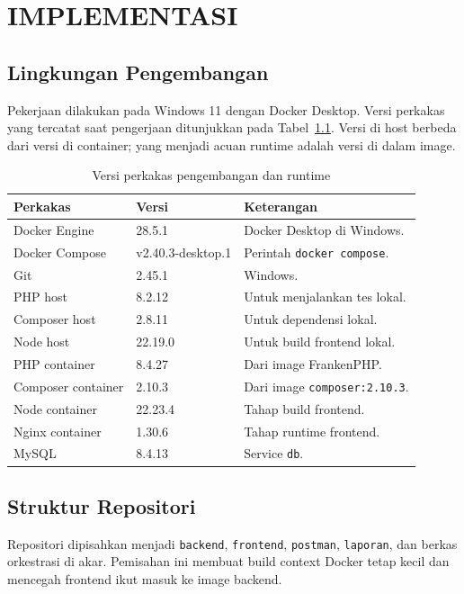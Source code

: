 \documentclass[12pt,a4paper,oneside]{book}
\begin{document}
\chapter{IMPLEMENTASI}
\label{chap:implementasi}

\section{Lingkungan Pengembangan}

Pekerjaan dilakukan pada Windows 11 dengan Docker Desktop. Versi perkakas yang
tercatat saat pengerjaan ditunjukkan pada Tabel~\ref{tab:versi}. Versi di host
berbeda dari versi di container; yang menjadi acuan runtime adalah versi di dalam
image.

\begin{table}[H]
\centering
\caption{Versi perkakas pengembangan dan runtime}
\label{tab:versi}
\begin{tabularx}{\textwidth}{@{}l l X@{}}
\toprule
\textbf{Perkakas} & \textbf{Versi} & \textbf{Keterangan} \\
\midrule
Docker Engine & 28.5.1 & Docker Desktop di Windows. \\
Docker Compose & v2.40.3-desktop.1 & Perintah \texttt{docker compose}. \\
Git & 2.45.1 & Windows. \\
PHP host & 8.2.12 & Untuk menjalankan tes lokal. \\
Composer host & 2.8.11 & Untuk dependensi lokal. \\
Node host & 22.19.0 & Untuk build frontend lokal. \\
PHP container & 8.4.27 & Dari image FrankenPHP. \\
Composer container & 2.10.3 & Dari image \texttt{composer:2.10.3}. \\
Node container & 22.23.4 & Tahap build frontend. \\
Nginx container & 1.30.6 & Tahap runtime frontend. \\
MySQL & 8.4.13 & Service \texttt{db}. \\
\bottomrule
\end{tabularx}
\end{table}

\section{Struktur Repositori}

Repositori dipisahkan menjadi \texttt{backend}, \texttt{frontend}, \texttt{postman},
\texttt{laporan}, dan berkas orkestrasi di akar. Pemisahan ini membuat build context
Docker tetap kecil dan mencegah frontend ikut masuk ke image backend.
\end{document}
